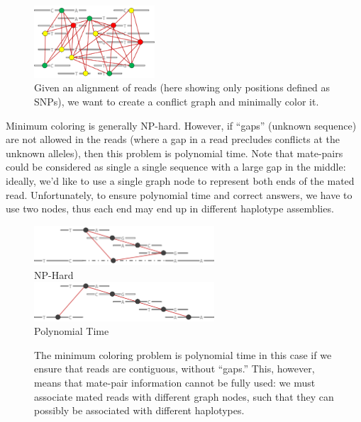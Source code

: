 \documentclass[11pt]{llncs}
\begin{document}
\begin{figure}[!h]
\centering
   \includegraphics[width=0.4\textwidth]{graphics/mincolor}
   \caption{Given an alignment of reads (here showing only positions defined as SNPs), we want to create a conflict graph and minimally color it.}
   \label{exampleConflictGraph}
\end{figure}



Minimum coloring is generally NP-hard. However, if ``gaps'' (unknown sequence) are not allowed in the reads (where a gap in a read precludes 
conflicts at the unknown alleles), then this problem is polynomial time. Note that mate-pairs could be considered as single a single sequence with a 
large gap in the middle: ideally, we'd like to use a single graph node to represent both ends of the mated read. Unfortunately, to ensure polynomial 
time and correct answers, we have to use two nodes, thus each end may end up in different haplotype assemblies.

\begin{figure}[!h]
\centering
   \includegraphics[width=0.6\textwidth]{graphics/mate-pair}\\
   NP-Hard\\
   \vspace{1em}
   \includegraphics[width=0.6\textwidth]{graphics/mate-pair_broken}\\
   Polynomial Time
   \caption{The minimum coloring problem is polynomial time in this case if we ensure that reads are contiguous, without ``gaps.'' This, however, 
   means that mate-pair information cannot be fully used: we must associate mated reads with different graph nodes, such that they can possibly
   be associated with different haplotypes.}
   \label{matePairs}
\end{figure}
\end{document}

